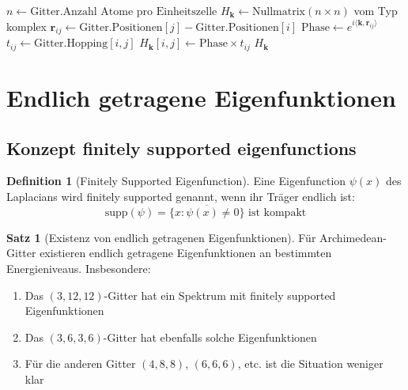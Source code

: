 \documentclass[a4paper,12pt]{article}
\theoremstyle{definition}
\newtheorem{definition}{Definition}[section]
\newtheorem{satz}{Satz}[section]
\begin{document}
\begin{algorithm}[h]
	\caption{Konstruktion des Floquet-Operators H(k)}
	\label{algo:floquet_construction}
	\begin{algorithmic}[1]
		\State $n \gets \text{Gitter}.\text{Anzahl Atome pro Einheitszelle}$
		\State $H_{\mathbf{k}} \gets \text{Nullmatrix}(n \times n)$ vom Typ komplex
					\State $\mathbf{r}_{ij} \gets \text{Gitter}.\text{Positionen}[j] - \text{Gitter}.\text{Positionen}[i]$
					\State $\text{Phase} \gets e^{i \langle \mathbf{k}, \mathbf{r}_{ij} \rangle}$
					\State $t_{ij} \gets \text{Gitter}.\text{Hopping}[i, j]$
					\State $H_{\mathbf{k}}[i, j] \gets \text{Phase} \times t_{ij}$
				\EndIf
			\EndFor
		\EndFor
		\State \Return $H_{\mathbf{k}}$ 
	\end{algorithmic}
\end{algorithm}

\section{Endlich getragene Eigenfunktionen}

\subsection{Konzept finitely supported eigenfunctions}

\begin{definition}[Finitely Supported Eigenfunction]
	Eine Eigenfunction $\psi(x)$ des Laplacians wird finitely supported genannt, wenn ihr Träger endlich ist:
	\[
	\text{supp}(\psi) = \overline{\{x : \psi(x) \neq 0\}} \text{ ist kompakt}
	\]
\end{definition}

\begin{satz}[Existenz von endlich getragenen Eigenfunktionen]
	\label{satz:finitely_supported}
	Für Archimedean-Gitter existieren endlich getragene Eigenfunktionen an bestimmten Energieniveaus. Insbesondere:
	\begin{enumerate}
		\item Das $(3,12,12)$-Gitter hat ein Spektrum mit finitely supported Eigenfunktionen
		\item Das $(3,6,3,6)$-Gitter hat ebenfalls solche Eigenfunktionen
		\item Für die anderen Gitter $(4,8,8)$, $(6,6,6)$, etc. ist die Situation weniger klar
	\end{enumerate}
\end{satz}
\end{document}
